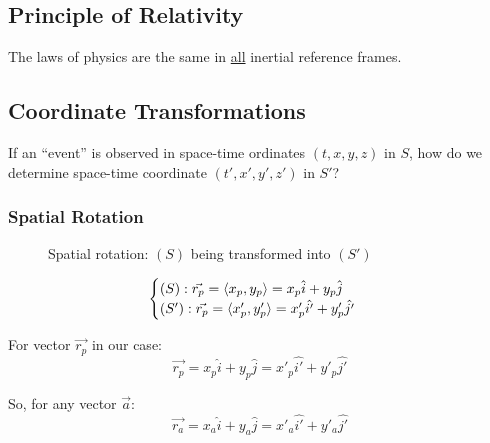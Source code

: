 \documentclass[a4paper,11pt]{article}
\numberwithin{equation}{section}
\begin{document}
 \subsection{Principle of Relativity}
 The laws of physics are the same in \underline{all} inertial reference frames.
 \subsection{Coordinate Transformations}
 If an ``event'' is observed in space-time ordinates $(t,x,y,z)$ in $S$, how do we determine space-time coordinate $(t', x', y', z')$ in $S'$?
 \subsubsection{Spatial Rotation}
  \begin{figure}[h!]
  \centering
   \caption{Spatial rotation: $(S)$ being transformed into $(S')$}
   \label{fig: rotate}
  \end{figure}
  
  \begin{equation} \label{eq:1}
  \begin{cases} 
    (S): \vec{r_{p}} = \braket{x_{p}, y_{p}} = x_{p}\hat{i} + y_{p}\hat{j} \\
    (S'): \vec{r_{p}} = \braket{x'_{p}, y'_{p}} = x'_{p}\hat{i'} + y'_{p}\hat{j'}
  \end{cases}
  \end{equation}
  
  \noindent For vector $\vec{r_{p}}$ in our case:
  \begin{equation} \label{eq:2}
   \vec{r_{p}} = x_{p}\hat{i} + y_{p}\hat{j} = x'_{p}\hat{i'} + y'_{p}\hat{j'}
  \end{equation}
  
  \noindent So, for any vector $\vec{a}$:
  \begin{equation} \label{eq:3}
   \vec{r_{a}} = x_{a}\hat{i} + y_{a}\hat{j} = x'_{a}\hat{i'} + y'_{a}\hat{j'}
  \end{equation}
  
\end{document}
